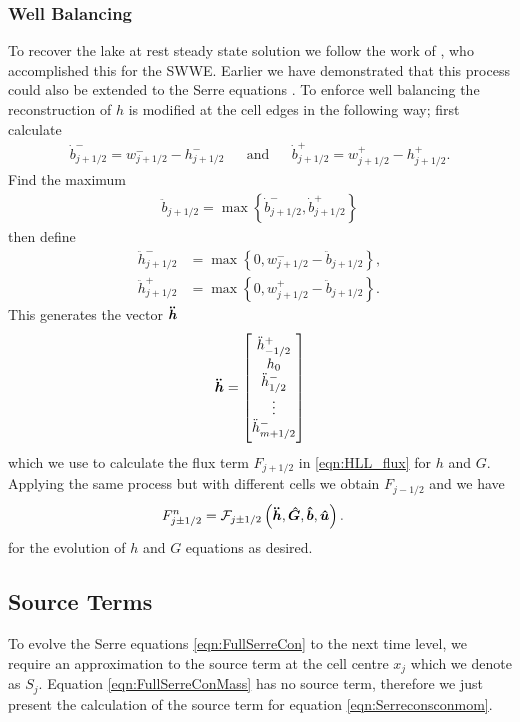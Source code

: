 \subsubsection{Well Balancing}
To recover the lake at rest steady state solution we follow the work of \citet{Klein-etal-2004-2050}, who accomplished this for the SWWE. Earlier we have demonstrated that this process could also be extended to the Serre equations \cite{Pitt-J-2014}. To enforce well balancing the reconstruction of $h$ is modified at the cell edges in the following way; first calculate
\begin{align}
\dot{b}^-_{j+1/2} = w^-_{j+1/2} - h^-_{j+1/2} & &\text{and}& &\dot{b}^+_{j+1/2} = w^+_{j+1/2} - h^+_{j+1/2}.
\label{eqn:BedReDefWmH}
\end{align}
Find the maximum
\begin{align*}
\ddot{b}_{j+1/2} = \max\left\lbrace\dot{b}^-_{j+1/2} , \dot{b}^+_{j+1/2} \right\rbrace
\end{align*}
then define
\begin{subequations}
\begin{align}
\ddot{h}^-_{j+1/2} &= \max\left\lbrace 0, w^-_{j+1/2} - \ddot{b}_{j+1/2}  \right\rbrace, \\  \ddot{h}^+_{j+1/2} &= \max\left\lbrace 0, w^+_{j+1/2} - \ddot{b}_{j+1/2} \right\rbrace.
\end{align}
\label{eqn:ModifiedHValue}
\end{subequations}
This generates the vector $\boldsymbol{\ddot{h}}$
\begin{equation*}
\vecn{\ddot{h}}= \begin{bmatrix} \TM
\ddot{h}^+_{-1/2} \\ h_0 \\ \ddot{h}^-_{1/2} \\ \vdots  \\ \ddot{h}^-_{m + 1/2}  \BM \end{bmatrix}
\end{equation*}
which we use to calculate the flux term $F_{j+1/2}$ in \eqref{eqn:HLL_flux} for $h$ and $G$. Applying the same process but with different cells we obtain $F_{j-1/2}$ and we have
\begin{align}	
F^n_{j\pm 1/2} &=\mathcal{F}_{j\pm1/2} \left(\boldsymbol{\ddot{h}}, \boldsymbol{\hat{G}},\boldsymbol{\hat{b}}, \boldsymbol{\hat{u}}  \right).
\label{eqn:FluxFEVM}
\end{align}
for the evolution of $h$ and $G$ equations as desired.

\subsection{Source Terms}
To evolve the Serre equations \eqref{eqn:FullSerreCon} to the next time level, we require an approximation to the source term at the cell centre $x_j$ which we denote as $S_j$. Equation \eqref{eqn:FullSerreConMass} has no source term, therefore we just present the calculation of the source term for equation \eqref{eqn:Serreconsconmom}.

